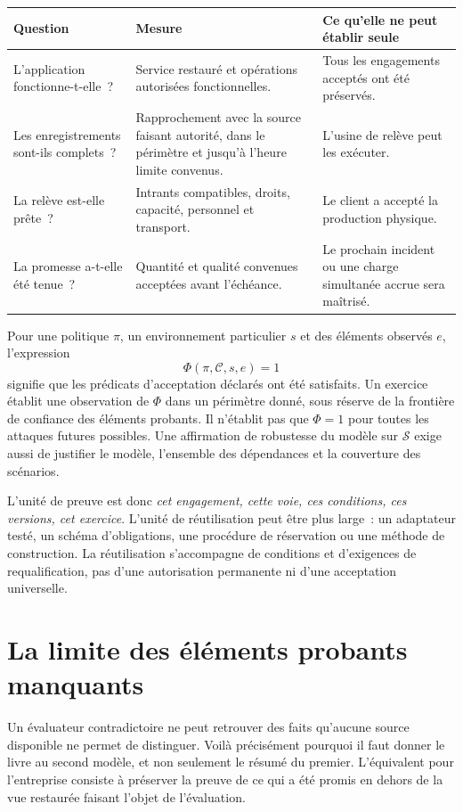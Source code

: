 \documentclass[11pt,a4paper]{article}
\begin{document}
\begin{center}\small
\begin{tabularx}{\textwidth}{P{.22\textwidth}YY}
\toprule
\textbf{Question} & \textbf{Mesure} & \textbf{Ce qu’elle ne peut établir seule}\\
\midrule
L’application fonctionne-t-elle~? & Service restauré et opérations autorisées fonctionnelles. & Tous les engagements acceptés ont été préservés.\\
Les enregistrements sont-ils complets~? & Rapprochement avec la source faisant autorité, dans le périmètre et jusqu’à l’heure limite convenus. & L’usine de relève peut les exécuter.\\
La relève est-elle prête~? & Intrants compatibles, droits, capacité, personnel et transport. & Le client a accepté la production physique.\\
La promesse a-t-elle été tenue~? & Quantité et qualité convenues acceptées avant l’échéance. & Le prochain incident ou une charge simultanée accrue sera maîtrisé.\\
\bottomrule
\end{tabularx}
\end{center}

Pour une politique $\pi$, un environnement particulier $s$ et des éléments observés $e$, l’expression
\begin{equation}
\Phi(\pi,\mathcal C,s,e)=1
\end{equation}
signifie que les prédicats d’acceptation déclarés ont été satisfaits. Un exercice établit une observation de $\Phi$ dans un périmètre donné, sous réserve de la frontière de confiance des éléments probants. Il n’établit pas que $\Phi=1$ pour toutes les attaques futures possibles. Une affirmation de robustesse du modèle sur $\mathcal S$ exige aussi de justifier le modèle, l’ensemble des dépendances et la couverture des scénarios.

L’unité de preuve est donc \emph{cet engagement, cette voie, ces conditions, ces versions, cet exercice}. L’unité de réutilisation peut être plus large~: un adaptateur testé, un schéma d’obligations, une procédure de réservation ou une méthode de construction. La réutilisation s’accompagne de conditions et d’exigences de requalification, pas d’une autorisation permanente ni d’une acceptation universelle.

\section{La limite des éléments probants manquants}\label{sec:evidenceLimit}
Un évaluateur contradictoire ne peut retrouver des faits qu’aucune source disponible ne permet de distinguer. Voilà précisément pourquoi il faut donner le livre au second modèle, et non seulement le résumé du premier. L’équivalent pour l’entreprise consiste à préserver la preuve de ce qui a été promis en dehors de la vue restaurée faisant l’objet de l’évaluation.
\end{document}
